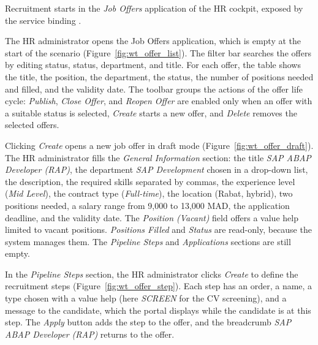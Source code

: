 Recruitment starts in the \emph{Job Offers} application of the HR cockpit, exposed by the service binding .


The HR administrator opens the Job Offers application, which is empty at the start of the scenario (Figure~\ref{fig:wt_offer_list}). The filter bar searches the offers by editing status, status, department, and title. For each offer, the table shows the title, the position, the department, the status, the number of positions needed and filled, and the validity date. The toolbar groups the actions of the offer life cycle: \emph{Publish}, \emph{Close Offer}, and \emph{Reopen Offer} are enabled only when an offer with a suitable status is selected, \emph{Create} starts a new offer, and \emph{Delete} removes the selected offers.


Clicking \emph{Create} opens a new job offer in draft mode (Figure~\ref{fig:wt_offer_draft}). The HR administrator fills the \emph{General Information} section: the title \emph{SAP ABAP Developer (RAP)}, the department \emph{SAP Development} chosen in a drop-down list, the description, the required skills separated by commas, the experience level (\emph{Mid Level}), the contract type (\emph{Full-time}), the location (Rabat, hybrid), two positions needed, a salary range from 9,000 to 13,000 MAD, the application deadline, and the validity date. The \emph{Position (Vacant)} field offers a value help limited to vacant positions. \emph{Positions Filled} and \emph{Status} are read-only, because the system manages them. The \emph{Pipeline Steps} and \emph{Applications} sections are still empty.


In the \emph{Pipeline Steps} section, the HR administrator clicks \emph{Create} to define the recruitment steps (Figure~\ref{fig:wt_offer_step}). Each step has an order, a name, a type chosen with a value help (here \emph{SCREEN} for the CV screening), and a message to the candidate, which the portal displays while the candidate is at this step. The \emph{Apply} button adds the step to the offer, and the breadcrumb \emph{SAP ABAP Developer (RAP)} returns to the offer.


